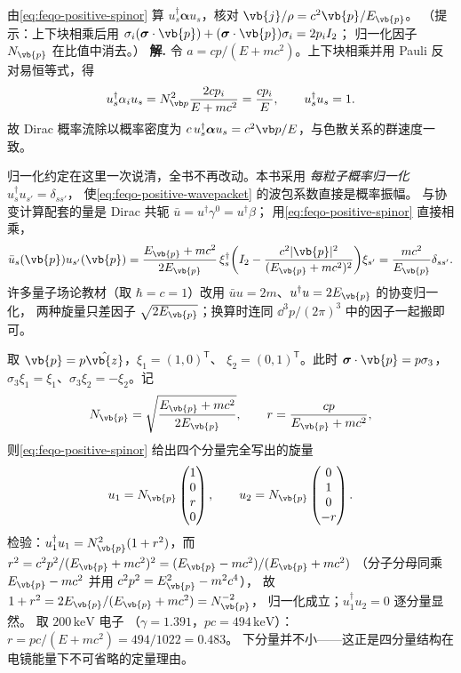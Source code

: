 \par
\begin{workedexample}
由\cref{eq:feqo-positive-spinor} 算
\(u_s^\dagger\boldsymbol\alpha u_s\)，核对
\(\vb{j}/\rho=c^2\vb{p}/E_{\vb{p}}\)。
（提示：上下块相乘后用
\(\sigma_i(\boldsymbol\sigma\cdot\vb{p})
+(\boldsymbol\sigma\cdot\vb{p})\sigma_i=2p_iI_2\)；
归一化因子 \(N_{\vb{p}}\) 在比值中消去。）
\textbf{解.} 令 \(a=cp/(E+mc^2)\)。上下块相乘并用 Pauli 反对易恒等式，得
\[
u_s^\dagger\alpha_i u_s=N_{\vb p}^2\frac{2cp_i}{E+mc^2}
=\frac{c p_i}{E},
\qquad u_s^\dagger u_s=1.
\]
故 Dirac 概率流除以概率密度为 \(c\,u_s^\dagger\boldsymbol\alpha u_s=c^2\vb p/E\)，与色散关系的群速度一致。
\end{workedexample}
\par
归一化约定在这里一次说清，全书不再改动。本书采用
\emph{每粒子概率归一化} \(u_s^\dagger u_{s'}=\delta_{ss'}\)，
使\cref{eq:feqo-positive-wavepacket} 的波包系数直接是概率振幅。
与协变计算配套的量是 Dirac 共轭
\(\bar u=u^\dagger\gamma^0=u^\dagger\beta\)；
用\cref{eq:feqo-positive-spinor} 直接相乘，
\[
\bar u_s(\vb{p})u_{s'}(\vb{p})
=\frac{E_{\vb{p}}+mc^2}{2E_{\vb{p}}}\,
\xi_s^\dagger\!\left(I_2-
\frac{c^2|\vb{p}|^2}{(E_{\vb{p}}+mc^2)^2}\right)\!\xi_{s'}
=\frac{mc^2}{E_{\vb{p}}}\delta_{ss'} .
\]
许多量子场论教材（取 \(\hbar=c=1\)）改用
\(\bar u u=2m\)、\(u^\dagger u=2E_{\vb{p}}\) 的协变归一化，
两种旋量只差因子 \(\sqrt{2E_{\vb{p}}}\)；换算时连同
\(\dd^3p/(2\pi)^3\) 中的因子一起搬即可。

\begin{example}[沿 \(z\) 轴动量的显式旋量]
取 \(\vb{p}=p\hat{\vb{z}}\)，\(\xi_1=(1,0)^\mathsf T\)、
\(\xi_2=(0,1)^\mathsf T\)。此时
\(\boldsymbol\sigma\cdot\vb{p}=p\sigma_3\)，
\(\sigma_3\xi_1=\xi_1\)、\(\sigma_3\xi_2=-\xi_2\)。记
\[
N_{\vb{p}}=\sqrt{\frac{E_{\vb{p}}+mc^2}{2E_{\vb{p}}}},\qquad
r=\frac{cp}{E_{\vb{p}}+mc^2},
\]
则\cref{eq:feqo-positive-spinor} 给出四个分量完全写出的旋量
\[
u_1=N_{\vb{p}}\begin{pmatrix}1\\0\\r\\0\end{pmatrix},\qquad
u_2=N_{\vb{p}}\begin{pmatrix}0\\1\\0\\-r\end{pmatrix}.
\]
检验：\(u_1^\dagger u_1=N_{\vb{p}}^2(1+r^2)\)，而
\(r^2=c^2p^2/(E_{\vb{p}}+mc^2)^2=(E_{\vb{p}}-mc^2)/(E_{\vb{p}}+mc^2)\)
（分子分母同乘 \(E_{\vb{p}}-mc^2\) 并用
\(c^2p^2=E_{\vb{p}}^2-m^2c^4\)），
故 \(1+r^2=2E_{\vb{p}}/(E_{\vb{p}}+mc^2)=N_{\vb{p}}^{-2}\)，
归一化成立；\(u_1^\dagger u_2=0\) 逐分量显然。
取 \(200\,\si{\kilo\electronvolt}\) 电子
（\(\gamma=1.391\)，\(pc=494\,\si{\kilo\electronvolt}\)）：
\(r=pc/(E+mc^2)=494/1022=0.483\)。
下分量并不小——这正是四分量结构在电镜能量下不可省略的定量理由。
\end{example}

